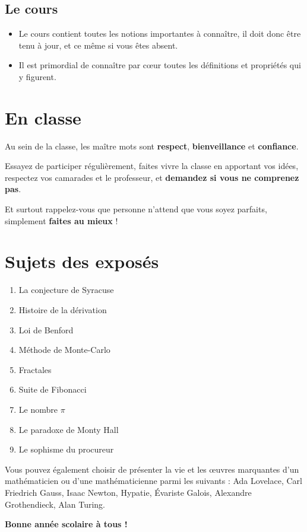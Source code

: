 \documentclass[oneside,12pt]{article}          %
\begin{document}
\subsection*{Le cours}
\begin{itemize}[label=$\bullet$]
	\item Le cours contient toutes les notions importantes à connaître, il doit donc être tenu à jour, et ce même si vous êtes absent.
	\item Il est primordial de connaître par cœur toutes les définitions et propriétés qui y figurent.
\end{itemize}



\section{En classe}

Au sein de la classe, les maître mots sont \textbf{respect}, \textbf{bienveillance} et \textbf{confiance}.

Essayez de participer régulièrement, faites vivre la classe en apportant vos idées, respectez vos camarades et le professeur, et \textbf{demandez si vous ne comprenez pas}.

Et surtout rappelez-vous que personne n'attend que vous soyez parfaits, simplement \textbf{faites au mieux} !



\section{Sujets des exposés}

\begin{enumerate}
	\item La conjecture de Syracuse
	\item Histoire de la dérivation
	\item Loi de Benford
	\item Méthode de Monte-Carlo
	\item Fractales
	\item Suite de Fibonacci
	\item Le nombre $\pi$
	\item Le paradoxe de Monty Hall
	\item Le sophisme du procureur
\end{enumerate}

Vous pouvez également choisir de présenter la vie et les œuvres marquantes d'un mathématicien ou d'une mathématicienne parmi les suivants : Ada Lovelace, Carl Friedrich Gauss, Isaac Newton, Hypatie, Évariste Galois, Alexandre Grothendieck, Alan Turing.




\vspace{2cm}

\begin{center}
	\textbf{Bonne année scolaire à tous !}
\end{center}
\end{document}
